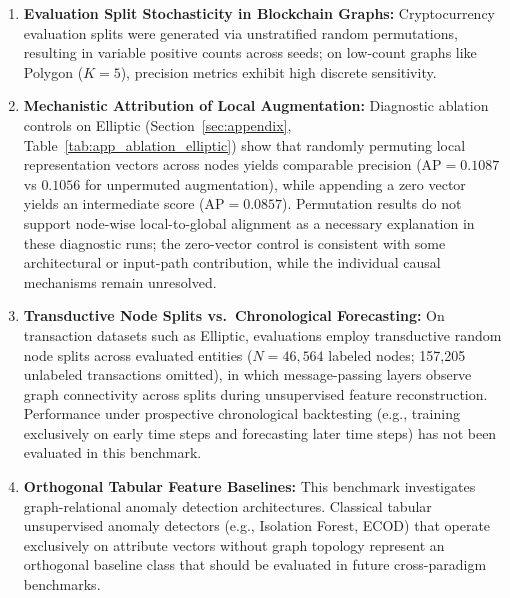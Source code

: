 \documentclass[applsci,article,submit,moreauthors,pdftex]{Definitions/mdpi}
\begin{document}
\begin{enumerate}
    \item \textbf{Evaluation Split Stochasticity in Blockchain Graphs:} Cryptocurrency evaluation splits were generated via unstratified random permutations, resulting in variable positive counts across seeds; on low-count graphs like Polygon ($K=5$), precision metrics exhibit high discrete sensitivity.
    \item \textbf{Mechanistic Attribution of Local Augmentation:} Diagnostic ablation controls on Elliptic (Section~\ref{sec:appendix}, Table~\ref{tab:app_ablation_elliptic}) show that randomly permuting local representation vectors across nodes yields comparable precision ($\mathrm{AP} = 0.1087$ vs $0.1056$ for unpermuted augmentation), while appending a zero vector yields an intermediate score ($\mathrm{AP} = 0.0857$). Permutation results do not support node-wise local-to-global alignment as a necessary explanation in these diagnostic runs; the zero-vector control is consistent with some architectural or input-path contribution, while the individual causal mechanisms remain unresolved.
    \item \textbf{Transductive Node Splits vs.\ Chronological Forecasting:} On transaction datasets such as Elliptic, evaluations employ transductive random node splits across evaluated entities ($N=46{,}564$ labeled nodes; 157,205 unlabeled transactions omitted), in which message-passing layers observe graph connectivity across splits during unsupervised feature reconstruction. Performance under prospective chronological backtesting (e.g., training exclusively on early time steps and forecasting later time steps) has not been evaluated in this benchmark.
    \item \textbf{Orthogonal Tabular Feature Baselines:} This benchmark investigates graph-relational anomaly detection architectures. Classical tabular unsupervised anomaly detectors (e.g., Isolation Forest, ECOD) that operate exclusively on attribute vectors without graph topology represent an orthogonal baseline class that should be evaluated in future cross-paradigm benchmarks.
\end{enumerate}
\end{document}
